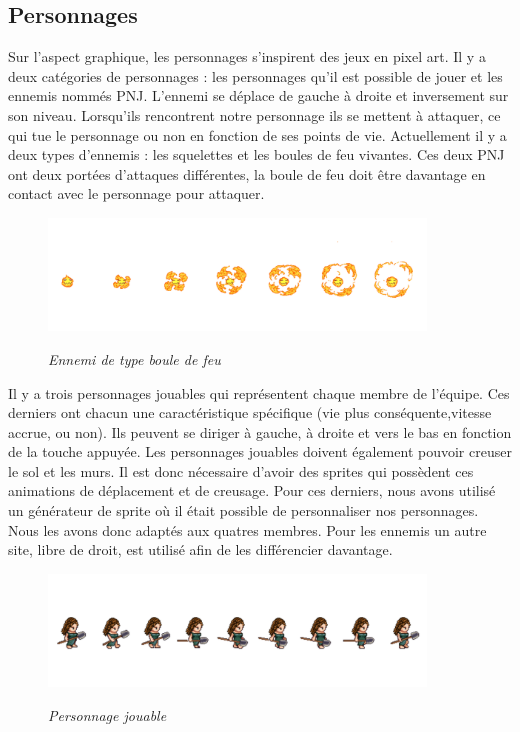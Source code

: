 \documentclass[a4paper,12pt]{article}
\begin{document}
\subsection{Personnages}
Sur l’aspect graphique, les personnages s’inspirent des jeux en pixel art. 
Il y  a deux catégories de personnages : les personnages qu’il est possible de jouer et les ennemis nommés PNJ.
L’ennemi se déplace de gauche à droite et inversement sur son niveau. 
Lorsqu’ils rencontrent notre personnage ils se mettent à attaquer, ce qui tue le personnage ou non en fonction de ses points de vie. 
Actuellement il y a deux types d’ennemis : les squelettes et les boules de feu vivantes. 
Ces deux PNJ ont deux portées d’attaques différentes, la boule de feu doit être davantage en contact avec le personnage pour attaquer.

\begin{figure}[h]
	\begin{center}
		\includegraphics[height=3cm]{img/exemple_feu.png}\\
		\caption{{\emph{Ennemi de type boule de feu}}}
		\label{boule de feu}
	\end{center}
\end{figure}

Il y a trois personnages jouables qui représentent chaque membre de l’équipe. 
Ces derniers ont chacun une caractéristique spécifique (vie plus conséquente,vitesse accrue, ou non). 
Ils peuvent se diriger à gauche, à droite et vers le bas en fonction de la touche appuyée. 
Les personnages jouables doivent également pouvoir creuser le sol et les murs. Il est donc nécessaire d’avoir des sprites qui possèdent ces animations de déplacement et de creusage.
Pour ces derniers, nous avons utilisé un générateur de sprite où il était possible de personnaliser nos personnages. Nous les avons donc adaptés aux quatres membres. 
Pour les ennemis un autre site, libre de droit, est utilisé afin de les différencier davantage.

\begin{figure}[h]
	\begin{center}
		\includegraphics[height=3cm]{img/exemple_personnage_jouable.png}\\
		\caption{{\emph{Personnage jouable}}}
		\label{personnage jouable}
	\end{center}
\end{figure}
\end{document}
